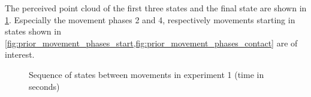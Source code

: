 The perceived point cloud of the first three states and the final state are shown in \cref{fig:prior_movement_phases}.
Especially the movement phases 2 and 4, respectively movements starting in states shown in \cref{fig:prior_movement_phases_start,fig:prior_movement_phases_contact} are of interest.

\begin{figure}[h]
\centering
{}
\caption[Exp. 1: States between movements]{Sequence of states between movements in experiment 1 (time in seconds)}
\label{fig:prior_movement_phases}
\end{figure}

